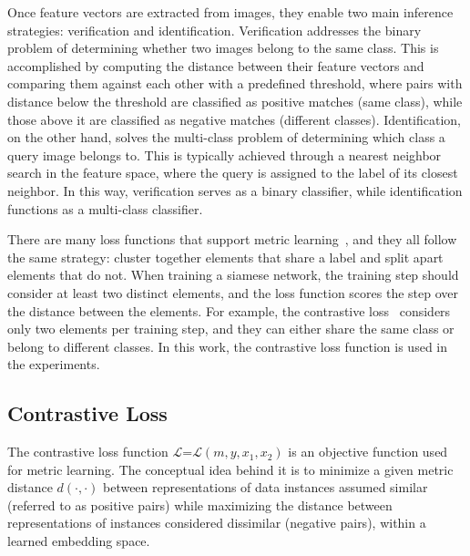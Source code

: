 Once feature vectors are extracted from images, they enable two main inference strategies: verification and identification. Verification addresses the binary problem of determining whether two images belong to the same class. This is accomplished by computing the distance between their feature vectors and comparing them against each other with a predefined threshold, where pairs with distance below the threshold are classified as positive matches (same class), while those above it are classified as negative matches (different classes). Identification, on the other hand, solves the multi-class problem of determining which class a query image belongs to. This is typically achieved through a nearest neighbor search in the feature space, where the query is assigned to the label of its closest neighbor. In this way, verification serves as a binary classifier, while identification functions as a multi-class classifier.

There are many loss functions that support metric learning~\cite{chopra_learning_2005,hoffer_deep_2018}, and they all follow the same strategy: cluster together elements that share a label and split apart elements that do not. When training a siamese network, the training step should consider at least two distinct elements, and the loss function scores the step over the distance between the elements. For example, the contrastive loss~\cite{chopra_learning_2005} considers only two elements per training step, and they can either share the same class or belong to different classes. In this work, the contrastive loss function is used in the experiments.

\subsection{Contrastive Loss}
\label{sec:contrastive_loss}

The contrastive loss function  $\mathcal{L}$=$\mathcal{L}(m, y, x_1, x_2)$ is an objective function used for metric learning. The conceptual idea behind it is to minimize a given metric distance $d(\cdot, \cdot)$ between representations of data instances assumed similar (referred to as positive pairs) while maximizing the distance between representations of instances considered dissimilar (negative pairs), within a learned embedding space.

